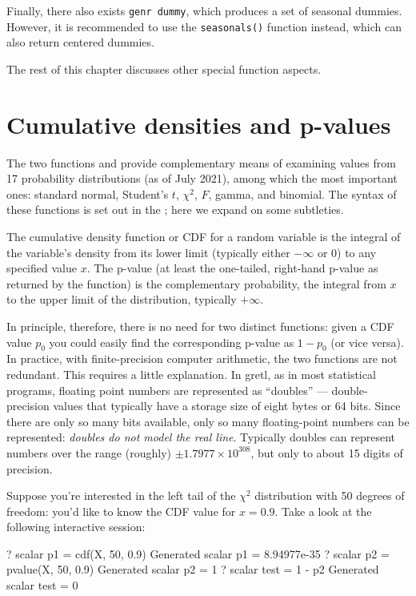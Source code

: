 Finally, there also exists \texttt{genr dummy}, which produces a set
of seasonal dummies. However, it is recommended to use the
\texttt{seasonals()} function instead, which can also return centered
dummies.

The rest of this chapter discusses other special function aspects.

\section{Cumulative densities and p-values}
\label{sec:genr-cdf}

The two functions  and  provide complementary
means of examining values from 17 probability distributions (as of 
July 2021), among which the most important ones:
standard normal, Student's $t$, $\chi^2$, $F$, gamma, and binomial.
The syntax of these functions is set out in the \GCR; here we expand
on some subtleties.

The cumulative density function or CDF for a random variable
is the integral of the variable's density from its lower limit
(typically either $-\infty$ or 0) to any specified value $x$.  The
p-value (at least the one-tailed, right-hand p-value as returned by
the  function) is the complementary probability, the
integral from $x$ to the upper limit of the distribution, typically
$+\infty$.

In principle, therefore, there is no need for two distinct functions:
given a CDF value $p_0$ you could easily find the corresponding
p-value as $1-p_0$ (or vice versa).  In practice, with
finite-precision computer arithmetic, the two functions are not
redundant.  This requires a little explanation.  In gretl, as in
most statistical programs, floating point numbers are represented as
``doubles'' --- double-precision values that typically have a storage
size of eight bytes or 64 bits.  Since there are only so many bits
available, only so many floating-point numbers can be represented:
\textit{doubles do not model the real line}.  Typically doubles can
represent numbers over the range (roughly) $\pm 1.7977 \times
10^{308}$, but only to about 15 digits of precision.

Suppose you're interested in the left tail of the $\chi^2$ distribution
with 50 degrees of freedom: you'd like to know the CDF value for $x =
0.9$.  Take a look at the following interactive session:
\begin{code}
? scalar p1 = cdf(X, 50, 0.9)
Generated scalar p1 = 8.94977e-35
? scalar p2 = pvalue(X, 50, 0.9)
Generated scalar p2 = 1
? scalar test = 1 - p2
Generated scalar test = 0
\end{code}

